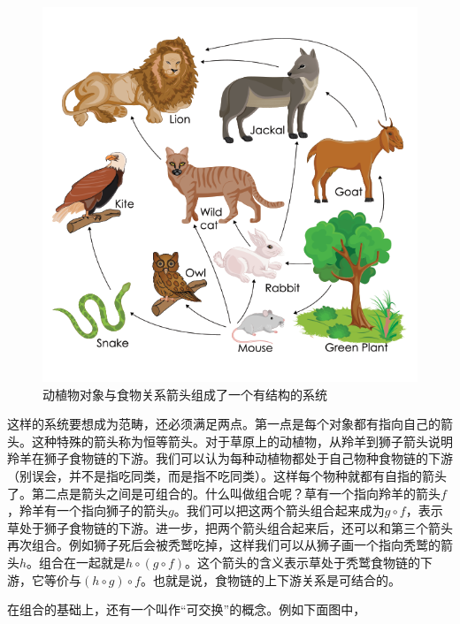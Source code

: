\documentclass[b5paper]{ctexart}
\begin{document}
\begin{figure}[htbp]
 \centering
 \includegraphics[scale=0.4]{img/food-chain.png}
 \caption{动植物对象与食物关系箭头组成了一个有结构的系统}
 \label{fig:food-chain}
\end{figure}

这样的系统要想成为范畴，还必须满足两点。第一点是每个对象都有指向自己的箭头。这种特殊的箭头称为恒等箭头。对于草原上的动植物，从羚羊到狮子箭头说明羚羊在狮子食物链的下游。我们可以认为每种动植物都处于自己物种食物链的下游（别误会，并不是指吃同类，而是指不吃同类）。这样每个物种就都有自指的箭头了。第二点是箭头之间是可组合的。什么叫做组合呢？草有一个指向羚羊的箭头$f$，羚羊有一个指向狮子的箭头$g$。我们可以把这两个箭头组合起来成为$g \circ f$，表示草处于狮子食物链的下游。进一步，把两个箭头组合起来后，还可以和第三个箭头再次组合。例如狮子死后会被秃鹫吃掉，这样我们可以从狮子画一个指向秃鹫的箭头$h$。组合在一起就是$h \circ (g \circ f)$。这个箭头的含义表示草处于秃鹫食物链的下游，它等价与$(h \circ g) \circ f$。也就是说，食物链的上下游关系是可结合的。

在组合的基础上，还有一个叫作“可交换”的概念。例如下面图中，

\begin{center}
\end{center}
\end{document}
